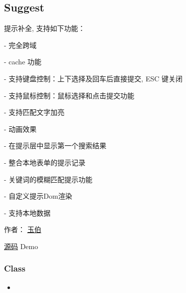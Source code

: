 \documentclass[letterpaper,10pt,english]{sphinxmanual}
\begin{document}
\subsection{Suggest}
\label{api/component/suggest/index:suggest}\label{api/component/suggest/index::doc}
\begin{DUlineblock}{0em}
\item[] 提示补全, 支持如下功能：
\item[]
\begin{DUlineblock}{\DUlineblockindent}
\item[] - 完全跨域
\item[] - cache 功能
\item[] - 支持键盘控制：上下选择及回车后直接提交, ESC 键关闭
\item[] - 支持鼠标控制：鼠标选择和点击提交功能
\item[] - 支持匹配文字加亮
\item[] - 动画效果
\item[] - 在提示层中显示第一个搜索结果
\item[] - 整合本地表单的提示记录
\item[] - 关键词的模糊匹配提示功能
\item[] - 自定义提示Dom渲染
\item[] - 支持本地数据
\end{DUlineblock}
\item[] 作者： \href{mailto:lifesinger@gmail.com}{玉伯}
\item[] \href{https://github.com/kissyteam/kissy/tree/master/src/suggest}{源码} \textbar{} Demo
\end{DUlineblock}


\subsubsection{Class}
\label{api/component/suggest/index:class}\begin{itemize}
\item {}
{\hyperref[api/component/suggest/index:Suggest.Suggest]{}}

\end{itemize}
\end{document}
